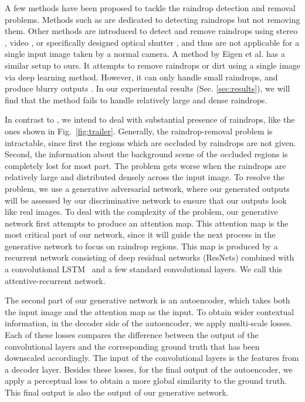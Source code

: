 \documentclass[10pt,twocolumn,letterpaper]{article}
\begin{document}
A few methods have been proposed to tackle the raindrop detection and removal problems. Methods such as \cite{roser2009video,roser2010realistic,kurihata2005rainy} are dedicated to detecting raindrops but not removing them. Other methods are introduced to detect and remove raindrops using stereo \cite{tanaka2006removal}, video \cite{yamashita2009noises,you2016adherent}, or specifically designed optical shutter \cite{hara2009removal}, and thus are not applicable for a single input image taken by a normal camera. A method by Eigen et al. \cite{eigen2013restoring} has a similar setup to ours. It attempts to remove raindrops or dirt using a single image via deep learning method. However, it can only handle small raindrops, and produce blurry outputs \cite{you2016adherent}. In our experimental results (Sec. \ref{sec:results}), we will find that the method fails to handle relatively large and dense raindrops.

In contrast to \cite{eigen2013restoring}, we intend to deal with substantial presence of raindrops, like the ones shown in Fig.~\ref{fig:trailer}.  Generally, the raindrop-removal problem is intractable, since first the regions which are occluded by raindrops are not given. Second, the information about the background scene of the occluded regions is completely lost for most part. The problem gets worse when the raindrops are relatively large and distributed densely across the input image.
To resolve the problem, we use a generative adversarial network, where our generated outputs will be assessed by our discriminative network to ensure that our outputs look like real images. To deal with the complexity of the problem, our generative network first attempts to produce an attention map. This attention map is the most critical part of our network, since it will  guide the next process in the generative network to focus on raindrop regions.
This map is produced by a recurrent network consisting of deep residual networks (ResNets) \cite{he2016deep} combined with a convolutional LSTM~\cite{xingjian2015convolutional} and a few standard convolutional layers. We call this attentive-recurrent network. 

The second part of our generative network is an autoencoder, which takes both the input image and the  attention map as the input. To obtain wider contextual information, in the decoder side of the autoencoder, we apply multi-scale losses.  Each of these losses compares the difference between the output of the convolutional layers and the corresponding ground truth that has been downscaled accordingly. The input of the convolutional layers is the features from a decoder layer. Besides these losses, for the final output of the autoencoder, we apply a perceptual loss to obtain a more global similarity to the ground truth. This final output is also the output of our generative network.
\end{document}
